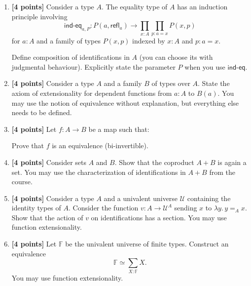\documentclass[11pt]{article}
\newcommand{\U}{\mathcal{U}}
\newcommand{\F}{\mathbb{F}}
\newcommand{\ap}{\mathsf{ap}}
\newcommand{\refl}{\mathsf{refl}}
\newcommand{\indeq}{\mathsf{ind\mbox{-}eq}}
\begin{document}
\begin{enumerate}

\item \label{path-associative}
\textbf{[4 points]}
Consider a type $A$.
The equality type of $A$ has an induction principle involving
\[
\indeq_{a,P} : P(a, \refl_a) \to \prod_{x : A} \prod_{p : a = x} P(x, p)
\]
for $a : A$ and a family of types $P(x, p)$ indexed by $x : A$ and $p : a = x$.

Define composition of identifications in $A$ (you can choose its with judgmental behaviour).
Explicitly state the parameter $P$ when you use $\indeq$.

\item \label{function-extensionality}
\textbf{[4 points]}
Consider a type $A$ and a family $B$ of types over $A$.
State the axiom of extensionality for dependent functions from $a : A$ to $B(a)$.
You may use the notion of equivalence without explanation, but everything else needs to be defined.

\item \label{path-split-equivalence}
\textbf{[4 points]}
Let $f : A \to B$ be a map such that:
Prove that $f$ is an equivalence (bi-invertible).

\item \label{set-coproduct}
\textbf{[4 points]}
Consider sets $A$ and $B$.
Show that the coproduct $A + B$ is again a set.
You may use the characterization of identifications in $A + B$ from the course.

\item \label{yoneda}
\textbf{[4 points]}
Consider a type $A$ and a univalent universe $\U$ containing the identity types of $A$.
Consider the function $v : A \to \U^A$ sending $x$ to $\lambda y.\,y =_A x$.
Show that the action of $v$ on identifications has a section.
You may use function extensionality.

\item \label{finite-types-add-point}
\textbf{[4 points]}
Let $\F$ be the univalent universe of finite types.
Construct an equivalence
\[
\F \simeq \sum_{X:\F} X
.\]
You may use function extensionality.

\end{enumerate}
\end{document}
